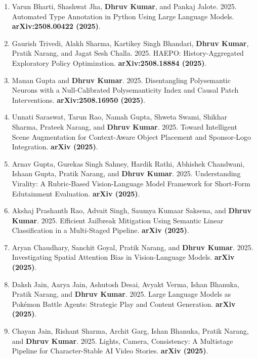 \documentclass[10pt, a4paper]{article}
\begin{document}
\begin{enumerate}[label=\textbf{P\arabic*.}, leftmargin=2.8em, itemsep=0.3em]
\item Varun Bharti, Shashwat Jha, \textbf{Dhruv Kumar}, and Pankaj Jalote. 2025. Automated Type Annotation in Python Using Large Language Models. \textbf{arXiv:2508.00422 (2025)}.

\item Gaurish Trivedi, Alakh Sharma, Kartikey Singh Bhandari, \textbf{Dhruv Kumar}, Pratik Narang, and Jagat Sesh Challa. 2025. HAEPO: History-Aggregated Exploratory Policy Optimization. \textbf{arXiv:2508.18884 (2025)}.

\item Manan Gupta and \textbf{Dhruv Kumar}. 2025. Disentangling Polysemantic Neurons with a Null-Calibrated Polysemanticity Index and Causal Patch Interventions. \textbf{arXiv:2508.16950 (2025)}.

\item Unnati Saraswat, Tarun Rao, Namah Gupta, Shweta Swami, Shikhar Sharma, Prateek Narang, and \textbf{Dhruv Kumar}. 2025. Toward Intelligent Scene Augmentation for Context-Aware Object Placement and Sponsor-Logo Integration. \textbf{arXiv (2025)}.

\item Arnav Gupta, Gurekas Singh Sahney, Hardik Rathi, Abhishek Chandwani, Ishaan Gupta, Pratik Narang, and \textbf{Dhruv Kumar}. 2025. Understanding Virality: A Rubric-Based Vision-Language Model Framework for Short-Form Edutainment Evaluation. \textbf{arXiv (2025)}.

\item Akshaj Prashanth Rao, Advait Singh, Saumya Kumaar Saksena, and \textbf{Dhruv Kumar}. 2025. Efficient Jailbreak Mitigation Using Semantic Linear Classification in a Multi-Staged Pipeline. \textbf{arXiv (2025)}.

\item Aryan Chaudhary, Sanchit Goyal, Pratik Narang, and \textbf{Dhruv Kumar}. 2025. Investigating Spatial Attention Bias in Vision-Language Models. \textbf{arXiv (2025)}.

\item Daksh Jain, Aarya Jain, Ashutosh Desai, Avyakt Verma, Ishan Bhanuka, Pratik Narang, and \textbf{Dhruv Kumar}. 2025. Large Language Models as Pok\'{e}mon Battle Agents: Strategic Play and Content Generation. \textbf{arXiv (2025)}.

\item Chayan Jain, Rishant Sharma, Archit Garg, Ishan Bhanuka, Pratik Narang, and \textbf{Dhruv Kumar}. 2025. Lights, Camera, Consistency: A Multistage Pipeline for Character-Stable AI Video Stories. \textbf{arXiv (2025)}.


\end{enumerate}
\end{document}
